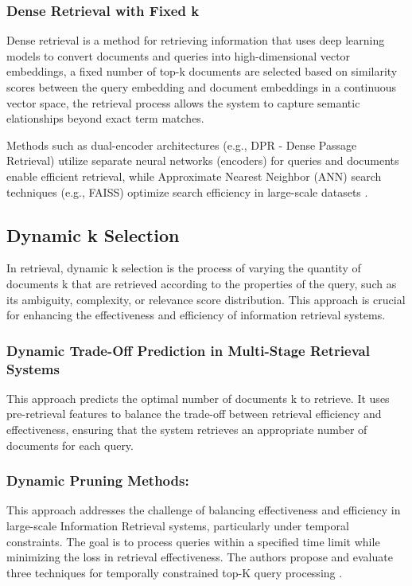 \subsubsection{Dense Retrieval with Fixed k} 
Dense retrieval \citep{karpukhin2020dense} is a method for retrieving information that uses deep learning models to convert documents and queries into high-dimensional vector embeddings, a fixed number of top-k documents are selected based on similarity scores between the query embedding and document embeddings in a continuous vector space, the retrieval process allows the system to capture semantic elationships beyond exact term matches.

Methods such as dual-encoder architectures (e.g., DPR - Dense Passage Retrieval)\citep{chen-etal-2024-dense} utilize separate neural networks (encoders) for queries and documents enable efficient retrieval, while Approximate Nearest Neighbor (ANN) search techniques (e.g., FAISS)\citep{enwiki:1276232158} optimize search efficiency in large-scale datasets .
\subsection{Dynamic k Selection}
In retrieval, dynamic k selection is the process of varying the quantity of documents k that are retrieved according to the properties of the query, such as its ambiguity, complexity, or relevance score distribution. This approach is crucial for enhancing the effectiveness and efficiency of information retrieval systems.

\subsubsection{Dynamic Trade-Off Prediction in Multi-Stage Retrieval Systems } This approach predicts the optimal number of documents k to retrieve. It uses pre-retrieval features to balance the trade-off between retrieval efficiency and effectiveness, ensuring that the system retrieves an appropriate number of documents for each query\citep{culpepper2016dynamictradeoffpredictionmultistage}.

\subsubsection{Dynamic Pruning Methods:}
This approach addresses the challenge of balancing effectiveness and efficiency in large-scale Information Retrieval systems, particularly under temporal constraints. The goal is to process queries within a specified time limit while minimizing the loss in retrieval effectiveness.\citep{10.1007/978-3-319-70145-5_1} The authors propose and evaluate three techniques for temporally constrained top-K query processing .
